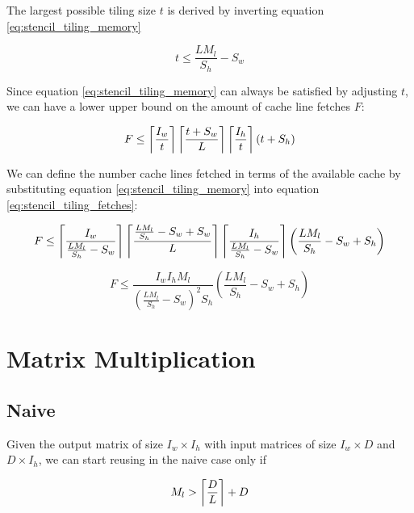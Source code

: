 The largest possible tiling size $t$ is derived by inverting equation \ref{eq:stencil_tiling_memory}

\begin{equation}
    t \leq \frac{L M_l}{S_h} - S_w
\end{equation}

Since equation \ref{eq:stencil_tiling_memory} can always be satisfied by adjusting $t$, we can have a lower upper bound on the amount of cache line fetches $F$:

\begin{equation}
    F \leq \left\lceil \frac{I_w}{t} \right\rceil \left\lceil \frac{t + S_w}{L} \right\rceil \left\lceil \frac{I_h}{t} \right\rceil (t + S_h)
    \label{eq:stencil_tiling_fetches}
\end{equation}

We can define the number cache lines fetched in terms of the available cache by substituting equation \ref{eq:stencil_tiling_memory} into equation \ref{eq:stencil_tiling_fetches}:

\begin{equation}
    F \leq \left\lceil \frac{I_w}{\frac{L M_l}{S_h} - S_w} \right\rceil \left\lceil \frac{\frac{L M_l}{S_h} - S_w + S_w}{L} \right\rceil \left\lceil \frac{I_h}{\frac{L M_l}{S_h} - S_w} \right\rceil \left(\frac{L M_l}{S_h} - S_w + S_h\right)
\end{equation}

\begin{equation}
    F \leq \frac{I_w I_h M_l}{(\frac{L M_l}{S_h} - S_w)^2 S_h} (\frac{L M_l}{S_h} - S_w + S_h)
\end{equation}



\section{Matrix Multiplication}

\subsection{Naive}

Given the output matrix of size $I_w \times I_h$ with input matrices of size $I_w \times D$ and $D \times I_h$, we can start reusing in the naive case only if

\begin{equation}
    \label{eq:mm_naive_minimum_cache}
    M_l > \left\lceil \frac{D}{L} \right\rceil + D
\end{equation}

